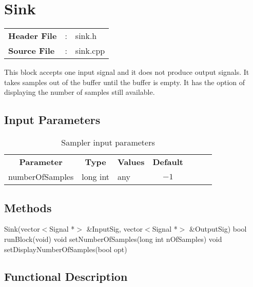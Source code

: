 \clearpage

\section{Sink}

\begin{tcolorbox}	
	\begin{tabular}{p{2.75cm} p{0.2cm} p{10.5cm}} 	
		\textbf{Header File}   &:& sink.h \\
		\textbf{Source File}   &:& sink.cpp \\
	\end{tabular}
\end{tcolorbox}

This block accepts one input signal and it does not produce output signals. It takes samples out of the buffer until the buffer is empty. It has the option of displaying the number of samples still available. 

\subsection*{Input Parameters}

\begin{table}[h]
	\centering
	\begin{tabular}{|c|c|p{60mm}|c|ccp{60mm}}
		\cline{1-4}
		\textbf{Parameter} & \textbf{Type} & \textbf{Values} &   \textbf{Default}& \\ \cline{1-4}
		numberOfSamples & long int & any & $-1$ \\ \cline{1-4}
	\end{tabular}
	\caption{Sampler input parameters}
	\label{table:sink_in_par}
\end{table}

\subsection*{Methods}

Sink(vector$<$Signal *$>$ \&InputSig, vector$<$Signal *$>$ \&OutputSig)
\bigbreak
bool runBlock(void)
\bigbreak
void setNumberOfSamples(long int nOfSamples)
\bigbreak
void setDisplayNumberOfSamples(bool opt)

\subsection*{Functional Description}